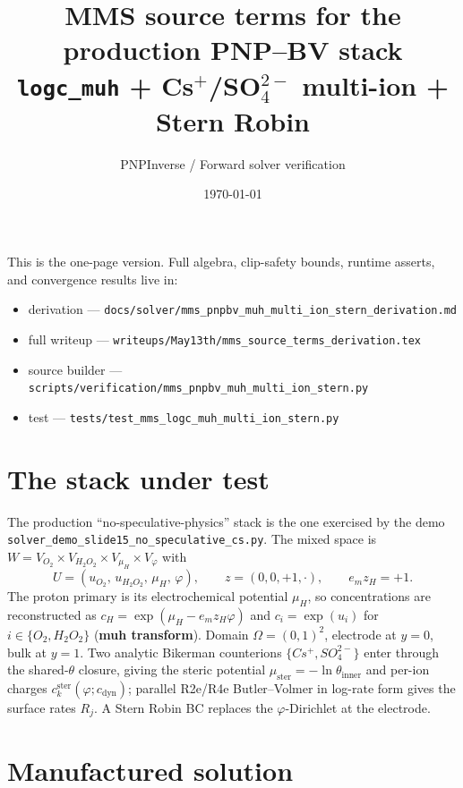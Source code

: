 \documentclass[11pt]{article}
\title{MMS source terms for the production PNP--BV stack\\
\large \texttt{logc\_muh} + Cs$^+$/SO$_4^{2-}$ multi-ion + Stern Robin}
\author{PNPInverse / Forward solver verification}
\date{\today}
\newcommand{\ster}{\mathrm{ster}}
\newcommand{\dyn}{\mathrm{dyn}}
\begin{document}
\sloppy
\maketitle

\noindent
This is the one-page version. Full algebra, clip-safety bounds, runtime
asserts, and convergence results live in:
\begin{itemize}\setlength{\itemsep}{0pt}
  \item derivation --- \verb|docs/solver/mms_pnpbv_muh_multi_ion_stern_derivation.md|
  \item full writeup --- \verb|writeups/May13th/mms_source_terms_derivation.tex|
  \item source builder --- \verb|scripts/verification/mms_pnpbv_muh_multi_ion_stern.py|
  \item test --- \verb|tests/test_mms_logc_muh_multi_ion_stern.py|
\end{itemize}

\section{The stack under test}

The production ``no-speculative-physics'' stack is the one exercised by the
demo \verb|solver_demo_slide15_no_speculative_cs.py|. The mixed space is
$W = V_{O_2}\times V_{H_2O_2}\times V_{\mu_H}\times V_\varphi$ with
\[
  U = (u_{O_2},\, u_{H_2O_2},\, \mu_H,\, \varphi),\qquad
  z = (0,0,+1,\cdot),\qquad e_m z_H = +1 .
\]
The proton primary is its electrochemical potential $\mu_H$, so
concentrations are reconstructed as
$c_H = \exp(\mu_H - e_m z_H\varphi)$ and $c_i = \exp(u_i)$ for
$i\in\{O_2,H_2O_2\}$ (\textbf{muh transform}). Domain $\Omega=(0,1)^2$,
electrode at $y=0$, bulk at $y=1$. Two analytic Bikerman counterions
$\{Cs^+,SO_4^{2-}\}$ enter through the shared-$\theta$ closure, giving the
steric potential $\mu_\ster=-\ln\theta_\mathrm{inner}$ and per-ion charges
$c_k^\ster(\varphi;c_\dyn)$; parallel R2e/R4e Butler--Volmer in log-rate
form gives the surface rates $R_j$. A Stern Robin BC replaces the
$\varphi$-Dirichlet at the electrode.

\section{Manufactured solution}
\end{document}
